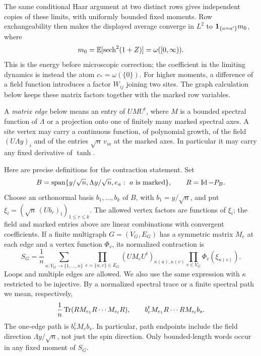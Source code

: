 The same conditional Haar argument at two distinct rows gives independent
copies of these limits, with uniformly bounded fixed moments.
Row exchangeability then makes the displayed average converge in $L^2$
to $\mathbf 1_{\{a=a'\}}m_0$, where
\begin{equation}
 m_0=\mathbb E[\operatorname{sech}^2(1+Z)]=\omega([0,\infty)).
 \label{eq:micro-zeroth-moment}
\end{equation}
This is the energy before microscopic correction; the coefficient in the
limiting dynamics is instead the atom $c_*=\omega(\{0\})$.
For higher moments, a difference of a field function introduces a factor
$W_{ij}$ joining two sites. The graph calculation below keeps these
matrix factors together with the marked row variables.

A \emph{matrix edge} below means an entry of $UMU^t$, where $M$ is a bounded
spectral function of $\Lambda$ or a projection onto one of finitely many
marked spectral axes. A site vertex may carry a continuous function, of
polynomial growth, of the field $(U\Lambda y)_i$ and of the entries
$\sqrt n\,v_{ia}$ at the marked axes. In particular it may carry any fixed
derivative of $\tanh$.

Here are precise definitions for the contraction statement. Set
\[
 B=\operatorname{span}\{y/\sqrt n,\Lambda y/\sqrt n,
                                e_a:\ a\text{ is marked}\},
 \qquad R=\operatorname{Id}-P_B.
\]
Choose an orthonormal basis $b_1,\ldots,b_k$ of $B$, with
$b_1=y/\sqrt n$, and put
$\xi_i=(\sqrt n\,(Ub_r)_i)_{1\le r\le k}$.
The allowed vertex factors are functions of $\xi_i$; the field and
marked entries above are linear combinations with convergent coefficients.
If a finite multigraph $G=(V_G,E_G)$ has a symmetric matrix $M_e$ at each
edge and a vertex function $\Phi_v$, its normalized contraction is
\begin{equation}
 S_G=\frac1n\sum_{\kappa:V_G\to\{1,\ldots,n\}}
       \prod_{e=\{u,v\}\in E_G}
          (UM_eU^t)_{\kappa(u),\kappa(v)}
       \prod_{v\in V_G}\Phi_v(\xi_{\kappa(v)}).
 \label{eq:micro-graph-sum}
\end{equation}
Loops and multiple edges are allowed. We also use the same expression
with $\kappa$ restricted to be injective. By a normalized spectral trace
or a finite spectral path we mean, respectively,
\begin{equation}
 \frac1n\operatorname{Tr}(RM_{e_1}R\cdots M_{e_l}R),
 \qquad
 b_r^tM_{e_1}R\cdots RM_{e_l}b_s.
 \label{eq:micro-spectral-words}
\end{equation}
The one-edge path is $b_r^tM_e b_s$. In particular, path endpoints include
the field direction $\Lambda y/\sqrt n$, not just the spin direction.
Only bounded-length words occur in any fixed moment of $S_G$.

